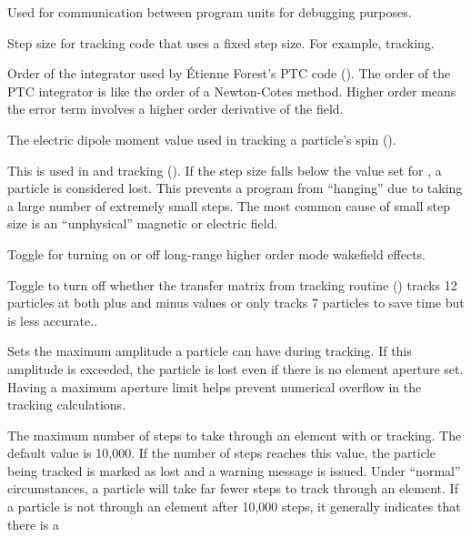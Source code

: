 {\begin{description}
Used for communication between program units for debugging purposes.
%
\item[\vn{default_ds_step}] \Newline
Step size for tracking code  that uses a fixed step
size. For example,  tracking.
%
\item[\vn{default_integ_order}] \Newline
Order of the integrator used by \'Etienne Forest's PTC code ().
The order of the PTC integrator is like the order of a Newton-Cotes method.
Higher order means the error term involves a higher order derivative of the field.
%
\item[\vn{electric_dipole_moment}] \Newline
The electric dipole moment value used in tracking a particle's spin ().
%
\item[\vn{fatal_ds_adaptive_tracking}] \Newline
This is used in  and  tracking
().  If the step size falls below the value set for
, a particle is considered lost.
This prevents a program from ``hanging'' due to taking a large number
of extremely small steps. The most common cause of small step size is
an ``unphysical'' magnetic or electric field.
%
\item[\vn{lr_wakes_on}] \Newline
Toggle for turning on or off long-range higher order mode wakefield effects.
%
\item[\vn{mat6_track_symmetric}] \Newline
Toggle to turn off whether the transfer matrix from tracking routine
() tracks 12 particles at both plus and minus
 values or only tracks 7 particles to save time but is less accurate..
%
\item[\vn{max_aperture_limit}] \Newline 
Sets the maximum amplitude a particle can have during tracking. If this amplitude is exceeded, the
particle is lost even if there is no element aperture set. Having a maximum aperture limit helps
prevent numerical overflow in the tracking calculations.
%
\item[\vn{max_num_runge_kutta_step}] \Newline 
The maximum number of steps to take through an element with  or
 tracking. The default value is 10,000. If the number of steps reaches this
value, the particle being tracked is marked as lost and a warning message is issued. Under
``normal'' circumstances, a particle will take far fewer steps to track through an element. If a
particle is not through an element after 10,000 steps, it generally indicates that there is a

\end{description}}
